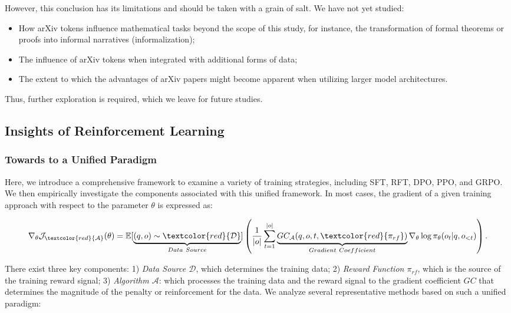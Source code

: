 \begin{itemize}[topsep=0pt]
\begin{itemize}[topsep=0pt]
However, this conclusion has its limitations and should be taken with a grain of salt. We have not yet studied:

\begin{itemize}[topsep=0pt]
    \item How arXiv tokens influence mathematical tasks beyond the scope of this study, for instance, the transformation of formal theorems or proofs into informal narratives (informalization);
    \item The influence of arXiv tokens when integrated with additional forms of data;
    \item The extent to which the advantages of arXiv papers might become apparent when utilizing larger model architectures.
\end{itemize}

Thus, further exploration is required, which we leave for future studies.

\subsection{Insights of Reinforcement Learning}
\subsubsection{Towards to a Unified Paradigm} Here, we introduce a comprehensive framework to examine a variety of training strategies, including SFT, RFT, DPO, PPO, and GRPO. We then empirically investigate the components associated with this unified framework. In most cases, the gradient of a given training approach with respect to the parameter $\theta$ is expressed as:

\begin{equation}
    \nabla_{\theta}\mathcal{J}_{\textcolor{red}{\mathcal{A}}}(\theta) = \mathbb{E}[\underbrace{(q,o) \sim \textcolor{red}{\mathcal{D}}}_{Data \ Source}]\left( \frac{1}{|o|} \sum_{t=1}^{|o|}  \underbrace{GC_{{\mathcal{A}}}(q, o, t, \textcolor{red}{\pi_{{rf}}})}_{Gradient \ Coefficient}  \nabla_{\theta}\log \pi_{\theta}(o_t | q, o_{<t})\right).
\label{eq:objective}
\end{equation}

There exist three key components: 1) \textit{Data Source $\mathcal{D}$}, which determines the training data; 2) \textit{Reward Function $\pi_{{rf}}$}, which is the source of the training reward signal; 3) \textit{Algorithm $\mathcal{A}$}: which processes the training data and the reward signal to the gradient coefficient $GC$ that determines the magnitude of the penalty or reinforcement for the data. We analyze several representative methods based on such a unified paradigm:


\end{itemize}
\end{itemize}
